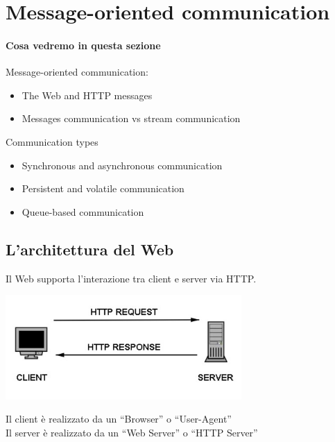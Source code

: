 \chapter{Message-oriented communication}
\subsubsection{Cosa vedremo in questa sezione}
Message-oriented communication:
\begin{itemize}
    \item The Web and HTTP messages
    \item Messages communication vs stream communication
\end{itemize}
Communication types
\begin{itemize}
    \item Synchronous and asynchronous communication
    \item Persistent and volatile communication
    \item Queue-based communication
\end{itemize}

\section{L'architettura del Web}
Il Web supporta l'interazione tra client e server via HTTP.
\begin{center}
    \includegraphics[width=0.675\textwidth]{img/MOC_architetture1.jpg}
\end{center}
Il client è realizzato da un “Browser” o “User-Agent”
\\Il server è realizzato da un “Web Server” o “HTTP Server”


